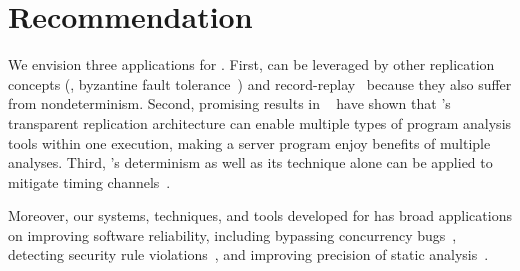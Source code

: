 

\section{Recommendation} \label{sec:recommendation}
We envision three applications for \xxx. First, \xxx can 
be leveraged by other replication concepts (\eg, byzantine fault 
tolerance~\cite{pbft:osdi99, zyzzyva:sosp07}) 
and record-replay~\cite{scribe:sigmetrics10, racepro:sosp11, respec:asplos10} 
because they also suffer from nondeterminism. Second, promising 
results in \repframe~\cite{repframe:apsys15} have shown that \xxx's transparent 
replication architecture can enable multiple types of program analysis tools 
within one execution, making a server program enjoy benefits of multiple 
analyses. Third, \xxx's determinism as well as its \timealgo technique alone 
can be applied to mitigate timing channels~\cite{Askarov:ccs10, Zhang:ccs11, 
Aviram:ccsw10}.

Moreover, our systems, techniques, and tools developed 
for \xxx has broad applications on improving software reliability, 
including bypassing concurrency bugs~\cite{wu:loom:osdi10}, detecting security 
rule violations~\cite{woodpecker:asplos13}, and improving precision of static 
analysis~\cite{wu:pldi12}. 

% 
